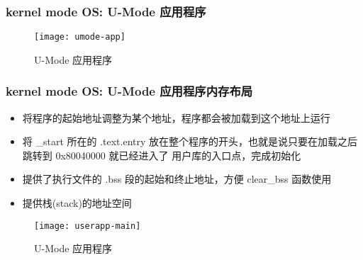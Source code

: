 \begin{frame}
	\frametitle{kernel mode OS: U-Mode 应用程序}
%		
%		
	\begin{figure}
        \centering
        \texttt{[image: umode-app]}
        \caption{U-Mode 应用程序}
    \end{figure}
\end{frame}

\begin{frame}
    \frametitle{kernel mode OS: U-Mode 应用程序内存布局}
    	\begin{itemize}
    		
    		\item 将程序的起始地址调整为某个地址，程序都会被加载到这个地址上运行
    		
    		\item 将 \_start 所在的 .text.entry 放在整个程序的开头，也就是说只要在加载之后跳转到 0x80040000 就已经进入了 用户库的入口点，完成初始化
            \item 提供了执行文件的 .bss 段的起始和终止地址，方便 clear\_bss 函数使用
            \item 提供栈(stack)的地址空间
    		
    	\end{itemize}	
    \begin{figure}
        \centering
        \texttt{[image: userapp-main]}
        \caption{U-Mode 应用程序}
    \end{figure}
\end{frame}

